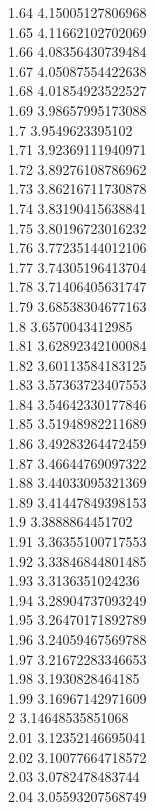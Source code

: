 {1.64	4.15005127806968\\
1.65	4.11662102702069\\
1.66	4.08356430739484\\
1.67	4.05087554422638\\
1.68	4.01854923522527\\
1.69	3.98657995173088\\
1.7	3.9549623395102\\
1.71	3.92369111940971\\
1.72	3.89276108786962\\
1.73	3.86216711730878\\
1.74	3.83190415638841\\
1.75	3.80196723016232\\
1.76	3.77235144012106\\
1.77	3.74305196413704\\
1.78	3.71406405631747\\
1.79	3.68538304677163\\
1.8	3.6570043412985\\
1.81	3.62892342100084\\
1.82	3.60113584183125\\
1.83	3.57363723407553\\
1.84	3.54642330177846\\
1.85	3.51948982211689\\
1.86	3.49283264472459\\
1.87	3.46644769097322\\
1.88	3.44033095321369\\
1.89	3.41447849398153\\
1.9	3.3888864451702\\
1.91	3.36355100717553\\
1.92	3.33846844801485\\
1.93	3.3136351024236\\
1.94	3.28904737093249\\
1.95	3.26470171892789\\
1.96	3.24059467569788\\
1.97	3.21672283346653\\
1.98	3.1930828464185\\
1.99	3.16967142971609\\
2	3.14648535851068\\
2.01	3.12352146695041\\
2.02	3.10077664718572\\
2.03	3.0782478483744\\
2.04	3.05593207568749\\
}
